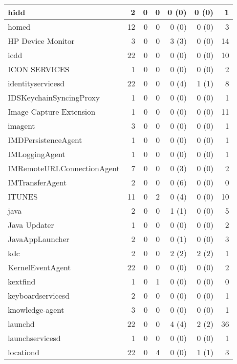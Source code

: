 \begin{adjustwidth}{-2in}{}
\begin{scriptsize}
\begin{longtable}[l]{ l | r | r | r | r | r | r }
    hidd & 2 &  0 &  0 &  0 (0) &  0 (0) &  1 \\ \hline
    homed & 12 &  0 &  0 &  0 (0) &  0 (0) &  3 \\ \hline
    HP Device Monitor &  3 &  0 &  0 &  3 (3) &  0 (0) & 14 \\ \hline
    icdd &  22 &  0 &  0 &  0 (0) &  0 (0) & 10 \\ \hline
    ICON SERVICES &  1 &  0 &  0 &  0 (0) &  0 (0) &  2 \\ \hline
    identityservicesd & 22 &  0 &  0 &  0 (4) &  1 (1) &  8 \\ \hline
    IDSKeychainSyncingProxy &  1 &  0 &  0 &  0 (0) &  0 (0) &  1 \\ \hline
    Image Capture Extension &  1 &  0 &  0 &  0 (0) &  0 (0) & 11 \\ \hline
    imagent &  3 &  0 &  0 &  0 (0) &  0 (0) &  1 \\ \hline
    IMDPersistenceAgent &  1 &  0 &  0 &  0 (0) &  0 (0) &  1 \\ \hline
    IMLoggingAgent & 1 &  0 &  0 &  0 (0) &  0 (0) &  1 \\ \hline
    IMRemoteURLConnectionAgent & 7 &  0 &  0 &  0 (3) &  0 (0) &  2 \\ \hline
    IMTransferAgent &  2 &  0 &  0 &  0 (6) &  0 (0) &  0 \\ \hline
    ITUNES &  11 &  0 &  2 &  0 (4) &  0 (0) & 10 \\ \hline
    java & 2 &  0 &  0 &  1 (1) &  0 (0) &  5 \\ \hline
    Java Updater &  1 &  0 &  0 &  0 (0) &  0 (0) &  2 \\ \hline
    JavaAppLauncher &  2 &  0 &  0 &  0 (1) &  0 (0) &  3 \\ \hline
    kdc &  2 &  0 &  0 &  2 (2) &  2 (2) &  1 \\ \hline
    KernelEventAgent &  22 &  0 &  0 &  0 (0) &  0 (0) &  2 \\ \hline
    kextfind & 1 &  0 &  1 &  0 (0) &  0 (0) &  0 \\ \hline
    keyboardservicesd &  2 &  0 &  0 &  0 (0) &  0 (0) &  1 \\ \hline
    knowledge-agent &  3 &  0 &  0 &  0 (0) &  0 (0) &  1 \\ \hline
    launchd & 22 &  0 &  0 &  4 (4) &  2 (2) & 36 \\ \hline
    launchservicesd &  1 &  0 &  0 &  0 (0) &  0 (0) &  1 \\ \hline
    locationd & 22 &  0 &  4 &  0 (0) &  1 (1) &  3 \\ \hline

\end{longtable}
\end{scriptsize}
\end{adjustwidth}
